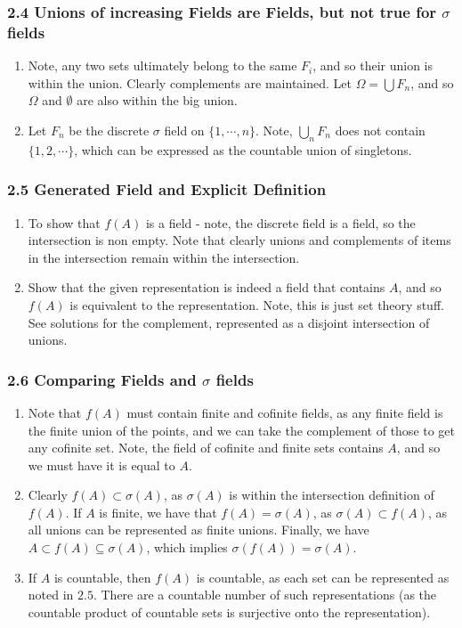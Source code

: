 \documentclass[12pt,a4paper]{article}
\newcommand{\1}[1]{\mathbbm{1}\left\{ #1 \right\}}
\begin{document}
\subsubsection{2.4 Unions of increasing Fields are Fields, but not true for $\sigma$ fields} 
\begin{enumerate}
\item Note, any two sets ultimately belong to the same $F_i$, and so their union is within the union. Clearly complements are maintained. Let $\Omega = \bigcup F_n$, and so $\Omega$ and $\emptyset$ are also within the big union.

\item Let $F_n$ be the discrete $\sigma$ field on $\{1, \cdots, n\}$. Note, $\bigcup_n F_n$ does not contain $\{1, 2, \cdots\}$, which can be expressed as the countable union of singletons.
\end{enumerate}

\subsubsection{2.5 Generated Field and Explicit Definition}
\begin{enumerate}
\item To show that $f(A)$ is a field - note, the discrete field is a field, so the intersection is non empty. Note that clearly unions and complements of items in the intersection remain within the intersection. 

\item Show that the given representation is indeed a field that contains $A$, and so $f(A)$ is equivalent to the representation. Note, this is just set theory stuff. See solutions for the complement, represented as a disjoint intersection of unions.
\end{enumerate}

\subsubsection{2.6 Comparing Fields and $\sigma$ fields}
\begin{enumerate}
\item Note that $f(A)$ must contain finite and cofinite fields, as any finite field is the finite union of the points, and we can take the complement of those to get any cofinite set. Note, the field of cofinite and finite sets contains $A$, and so we must have it is equal to $A$.

\item Clearly $f(A) \subset \sigma(A)$, as $\sigma(A)$ is within the intersection definition of $f(A)$. If $A$ is finite, we have that $f(A) = \sigma(A)$, as $\sigma(A) \subset f(A)$, as all unions can be represented as finite unions. Finally, we have $A \subset f(A) \subseteq \sigma(A)$, which implies $\sigma(f(A)) = \sigma(A)$.

\item If $A$ is countable, then $f(A)$ is countable, as each set can be represented as noted in $2.5$. There are a countable number of such representations (as the countable product of countable sets is surjective onto the representation).

\end{enumerate}
\end{document}
